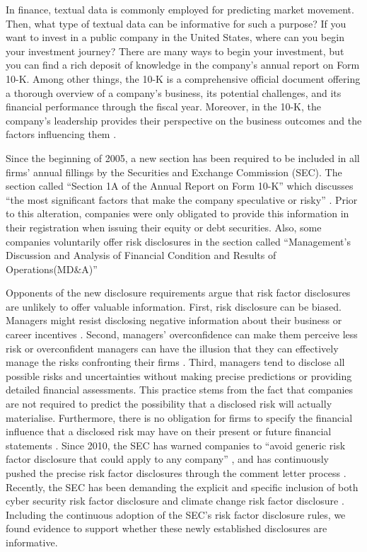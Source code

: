 \documentclass[logo,bsc,singlespacing,parskip]{infthesis}
\begin{document}
In finance, textual data is commonly employed for predicting market movement. Then, what type of textual data can be informative for such a purpose? If you want to invest in a public company in the United States, where can you begin your investment journey? There are many ways to begin your investment, but you can find a rich deposit of knowledge in the company’s annual report on Form 10-K. Among other things, the 10-K is a comprehensive official document offering a thorough overview of a company’s business, its potential challenges, and its financial performance through the fiscal year. Moreover, in the 10-K, the company’s leadership provides their perspective on the business outcomes and the factors influencing them \cite{secinvestor2011}. 

Since the beginning of 2005, a new section has been required to be included in all firms’ annual fillings by the Securities and Exchange Commission (SEC). The section called “Section 1A of the Annual Report on Form 10-K” which discusses “the most significant factors that make the company speculative or risky” \cite{sec2005}. Prior to this alteration, companies were only obligated to provide this information in their registration when issuing their equity or debt securities. Also, some companies voluntarily offer risk disclosures in the section called “Management’s Discussion and Analysis of Financial Condition and Results of Operations(MD\&A)” 

Opponents of the new disclosure requirements argue that risk factor disclosures are unlikely to offer valuable information. First, risk disclosure can be biased. Managers might resist disclosing negative information about their business or career incentives 
\cite{wattszimmerman1986}\cite{scott1994}\cite{fieldsetal2001}\cite{kotharietal2009a}\cite{kotharietal2009b}. Second, managers’ overconfidence can make them perceive less risk or overconfident managers can have the illusion that they can effectively manage the risks confronting their firms \cite{chang2019}. Third, managers tend to disclose all possible risks and uncertainties without making precise predictions or providing detailed financial assessments. This practice stems from the fact that companies are not required to predict the possibility that a disclosed risk will actually materialise. Furthermore, there is no obligation for firms to specify the financial influence that a disclosed risk may have on their present or future financial statements \cite{reuters2005}. Since 2010, the SEC has warned companies to “avoid generic risk factor disclosure that could apply to any company” \cite{sec2010}, and has continuously pushed the precise risk factor disclosures through the comment letter process \cite{cfo2010}. Recently, the SEC has been demanding the explicit and specific inclusion of both cyber security risk factor disclosure and climate change risk factor disclosure \citep{kingsleyetal2021}\citep{peirce2023}. Including the continuous adoption of the SEC’s risk factor disclosure rules, we found evidence to support whether these newly established disclosures are informative.
\end{document}
